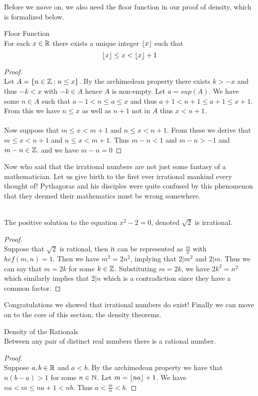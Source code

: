 \documentclass[a4paper]{article}
\begin{document}
Before we move on, we also need the floor function in our proof of density, which is formalized below. 

\begin{prp}{Floor Function}{}\\ For each $x\in\mathbb{R}$ there exists a unique integer $\lfloor x\rfloor$ such that $$\lfloor x\rfloor\leq x<\lfloor x\rfloor+1$$ 
\begin{proof}\\ Let $A=\{n\in\mathbb{Z}:n\leq x\}$. By the archimedean property there exists $k>-x$ and thus $-k<x$ with $-k\in A$ hence $A$ is non-empty. Let $a=sup(A)$. We have some $n\in A$ such that $a-1<n\leq a\leq x$ and thus $a+1<n+1\leq a+1\leq x+1$. From this we have $n\leq x$ as well as $n+1$ not in $A$ thus $x<n+1$. \\~\\
Now suppose that $m\leq x<m+1$ and $n\leq x<n+1$. From these we derive that $m\leq x<n+1$ and $n\leq x<m+1$. Thus $m-n<1$ and $m-n>-1$ and $m-n\in\mathbb{Z}$. and we have $m-n=0$
\end{proof}
\end{prp}

Now who said that the irrational numbers are not just some fantasy of a mathematician. Let us give birth to the first ever irrational mankind every thought of! Pythagoras and his disciples were quite confused by this phenomenon that they deemed their mathematics must be wrong somewhere. 

\begin{lmm}{}{}\\ The positive solution to the equation $x^2-2=0 $, denoted $\sqrt{2}$ is irrational. 
\begin{proof}\\ Suppose that $\sqrt{2}$ is rational, then it can be represented as $\frac{m}{n}$ with $hcf(m,n)=1$. Then we have $m^2=2n^2$, implying that $2|m^2$ and $2|m$. Thus we can say that $m=2k$ for some $k\in\mathbb{Z}$. Substituting $m=2k$, we have $2k^2=n^2$ which similarly implies that $2|n$ which is a contradiction since they have a common factor. 
\end{proof}
\end{lmm}

Congratulations we showed that irrational numbers do exist! Finally we can move on to the core of this section, the density theorems. 

\begin{thm}{Density of the Rationals}{}\\ Between any pair of distinct real numbers there is a rational number. 
\begin{proof}\\ Suppose $a,b\in\mathbb{R}$ and $a<b$. By the archimedean property we have that $n(b-a)>1$ for some $n\in\mathbb{N}$. Let $m=\lfloor na\rfloor+1$. We have $na<m\leq na+1<nb$. Thus $a<\frac{m}{n}<b$. 
\end{proof}
\end{thm}
\end{document}
